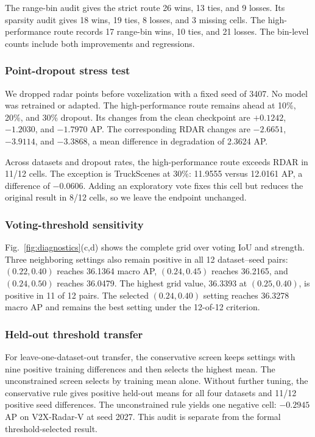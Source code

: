 \documentclass[sensors,article,submit,pdftex,moreauthors]{Definitions/mdpi}
\providecommand{\figref}[1]{}
\renewcommand{\figref}[1]{\textcolor{floatreviewblue}{Fig.~\ref{#1}}}
\renewcommand{\figref}[1]{Fig.~\ref{#1}}
\begin{document}
The range-bin audit gives the strict route 26 wins, 13 ties, and 9 losses. Its
sparsity audit gives 18 wins, 19 ties, 8 losses, and 3 missing cells. The
high-performance route records 17 range-bin wins, 10 ties, and 21 losses.
The bin-level counts include both improvements and regressions.

\subsubsection{Point-dropout stress test}

We dropped radar points before voxelization with a fixed seed of 3407. No model
was retrained or adapted. The high-performance route remains ahead at 10\%,
20\%, and 30\% dropout. Its changes from the clean checkpoint are $+0.1242$,
$-1.2030$, and $-1.7970$ AP. The corresponding RDAR changes are $-2.6651$,
$-3.9114$, and $-3.3868$, a mean difference in degradation of 2.3624 AP.

Across datasets and dropout rates, the high-performance route exceeds RDAR in
11/12 cells. The exception is TruckScenes at 30\%: 11.9555 versus 12.0161 AP,
a difference of $-0.0606$. Adding an exploratory vote fixes this cell but
reduces the original result in 8/12 cells, so we leave the endpoint unchanged.

\subsubsection{Voting-threshold sensitivity}

\figref{fig:diagnostics}(c,d) shows the complete grid over voting IoU and
strength. Three neighboring settings also remain positive in all 12
dataset--seed pairs: $(0.22,0.40)$ reaches 36.1364 macro AP, $(0.24,0.45)$
reaches 36.2165, and $(0.24,0.50)$ reaches 36.0479. The highest grid value,
36.3393 at $(0.25,0.40)$, is positive in 11 of 12 pairs. The selected
$(0.24,0.40)$ setting reaches 36.3278 macro AP and remains the best setting
under the 12-of-12 criterion.

\subsubsection{Held-out threshold transfer}

For leave-one-dataset-out transfer, the conservative screen keeps settings with
nine positive training differences and then selects the highest mean. The
unconstrained screen selects by training mean alone. Without further tuning,
the conservative rule gives positive held-out means for all four datasets and
11/12 positive seed differences. The unconstrained rule yields one negative
cell: $-0.2945$ AP on V2X-Radar-V at seed 2027. This audit is separate from the
formal threshold-selected result.
\end{document}
